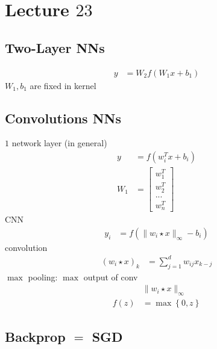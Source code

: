\documentclass{article}
\begin{document}
\section{Lecture $23$} 

\subsection{Two-Layer NNs}
\begin{align*}
y  &= W_{2} f \left(W_{1} x + b_{1}\right)
\end{align*}
$W_{1}, b_{1}$ are fixed in kernel



\subsection{Convolutions NNs}
$1$ network layer (in general)
\begin{align*}
y  &= f\left(w_{i}^{T} x + b_{i}\right)
\\ W_{1} &= \begin{bmatrix} w_{1}^{T} \\ w_{2}^{T} \\ ... \\ w_{n}^{T} \end{bmatrix}
\end{align*}
CNN
\begin{align*}
y_{i} &= f\left(\| w_{i} \star x \|_{\infty} - b_{i}\right)
\end{align*}
convolution
\begin{align*}
\left(w_{i} \star x\right)_{k} &= \displaystyle\sum_{j=1}^{d} w_{ij} x_{k-j}
\end{align*}
$\displaystyle\max$ pooling: $\displaystyle\max$ output of conv
\begin{align*}
&\| w_{i} \star x \|_{\infty}
\\ f\left(z\right)  &= \displaystyle\max\left\{0, z \right\}
\end{align*}


\subsection{Backprop  $=$ SGD}
\end{document}
